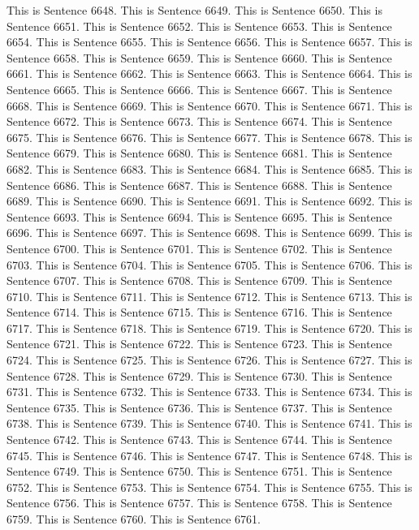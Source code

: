 \documentclass{article}
\begin{document}
This is Sentence 6648.
This is Sentence 6649.
This is Sentence 6650.
This is Sentence 6651.
This is Sentence 6652.
This is Sentence 6653.
This is Sentence 6654.
This is Sentence 6655.
This is Sentence 6656.
This is Sentence 6657.
This is Sentence 6658.
This is Sentence 6659.
This is Sentence 6660.
This is Sentence 6661.
This is Sentence 6662.
This is Sentence 6663.
This is Sentence 6664.
This is Sentence 6665.
This is Sentence 6666.
This is Sentence 6667.
This is Sentence 6668.
This is Sentence 6669.
This is Sentence 6670.
This is Sentence 6671.
This is Sentence 6672.
This is Sentence 6673.
This is Sentence 6674.
This is Sentence 6675.
This is Sentence 6676.
This is Sentence 6677.
This is Sentence 6678.
This is Sentence 6679.
This is Sentence 6680.
This is Sentence 6681.
This is Sentence 6682.
This is Sentence 6683.
This is Sentence 6684.
This is Sentence 6685.
This is Sentence 6686.
This is Sentence 6687.
This is Sentence 6688.
This is Sentence 6689.
This is Sentence 6690.
This is Sentence 6691.
This is Sentence 6692.
This is Sentence 6693.
This is Sentence 6694.
This is Sentence 6695.
This is Sentence 6696.
This is Sentence 6697.
This is Sentence 6698.
This is Sentence 6699.
This is Sentence 6700.
This is Sentence 6701.
This is Sentence 6702.
This is Sentence 6703.
This is Sentence 6704.
This is Sentence 6705.
This is Sentence 6706.
This is Sentence 6707.
This is Sentence 6708.
This is Sentence 6709.
This is Sentence 6710.
This is Sentence 6711.
This is Sentence 6712.
This is Sentence 6713.
This is Sentence 6714.
This is Sentence 6715.
This is Sentence 6716.
This is Sentence 6717.
This is Sentence 6718.
This is Sentence 6719.
This is Sentence 6720.
This is Sentence 6721.
This is Sentence 6722.
This is Sentence 6723.
This is Sentence 6724.
This is Sentence 6725.
This is Sentence 6726.
This is Sentence 6727.
This is Sentence 6728.
This is Sentence 6729.
This is Sentence 6730.
This is Sentence 6731.
This is Sentence 6732.
This is Sentence 6733.
This is Sentence 6734.
This is Sentence 6735.
This is Sentence 6736.
This is Sentence 6737.
This is Sentence 6738.
This is Sentence 6739.
This is Sentence 6740.
This is Sentence 6741.
This is Sentence 6742.
This is Sentence 6743.
This is Sentence 6744.
This is Sentence 6745.
This is Sentence 6746.
This is Sentence 6747.
This is Sentence 6748.
This is Sentence 6749.
This is Sentence 6750.
This is Sentence 6751.
This is Sentence 6752.
This is Sentence 6753.
This is Sentence 6754.
This is Sentence 6755.
This is Sentence 6756.
This is Sentence 6757.
This is Sentence 6758.
This is Sentence 6759.
This is Sentence 6760.
This is Sentence 6761.
\end{document}

